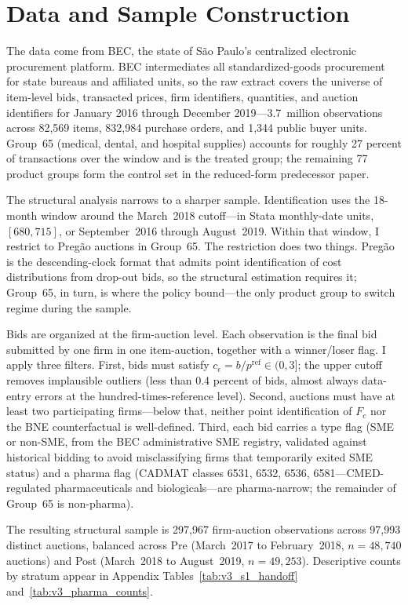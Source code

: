 \section{Data and Sample Construction}\label{sec:data}

The data come from BEC, the state of S\~ao Paulo's centralized electronic procurement platform. BEC intermediates all standardized-goods procurement for state bureaus and affiliated units, so the raw extract covers the universe of item-level bids, transacted prices, firm identifiers, quantities, and auction identifiers for January 2016 through December 2019---3.7~million observations across 82{,}569 items, 832{,}984 purchase orders, and 1{,}344 public buyer units. Group~65 (medical, dental, and hospital supplies) accounts for roughly 27 percent of transactions over the window and is the treated group; the remaining 77 product groups form the control set in the reduced-form predecessor paper.

The structural analysis narrows to a sharper sample. Identification uses the 18-month window around the March~2018 cutoff---in Stata monthly-date units, $[680, 715]$, or September~2016 through August~2019. Within that window, I restrict to Preg\~ao auctions in Group~65. The restriction does two things. Preg\~ao is the descending-clock format that admits point identification of cost distributions from drop-out bids, so the structural estimation requires it; Group~65, in turn, is where the policy bound---the only product group to switch regime during the sample.

Bids are organized at the firm-auction level. Each observation is the final bid submitted by one firm in one item-auction, together with a winner/loser flag. I apply three filters. First, bids must satisfy $c_\epsilon = b / p^{\mathrm{ref}} \in (0, 3]$; the upper cutoff removes implausible outliers (less than 0.4 percent of bids, almost always data-entry errors at the hundred-times-reference level). Second, auctions must have at least two participating firms---below that, neither point identification of $F_c$ nor the BNE counterfactual is well-defined. Third, each bid carries a type flag (SME or non-SME, from the BEC administrative SME registry, validated against historical bidding to avoid misclassifying firms that temporarily exited SME status) and a pharma flag (CADMAT classes 6531, 6532, 6536, 6581---CMED-regulated pharmaceuticals and biologicals---are pharma-narrow; the remainder of Group~65 is non-pharma).

The resulting structural sample is 297{,}967 firm-auction observations across 97{,}993 distinct auctions, balanced across Pre (March~2017 to February~2018, $n = 48{,}740$ auctions) and Post (March~2018 to August~2019, $n = 49{,}253$). Descriptive counts by stratum appear in Appendix Tables~\ref{tab:v3_s1_handoff} and~\ref{tab:v3_pharma_counts}.

